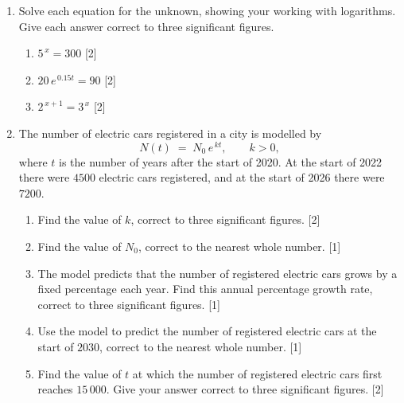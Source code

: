 \documentclass[12pt, twoside]{article}
\begin{document}
\begin{enumerate}[itemsep=0.15cm]
\newpage

\item[2.] [Maximum mark: 6]

Solve each equation for the unknown, showing your working with
logarithms. Give each answer correct to three significant figures.

\begin{enumerate}[itemsep=0.1cm]
  \item $5^{\,x} = 300$ \hfill [2]
  \item $20\, e^{\,0.15 t} = 90$ \hfill [2]
  \item $2^{\,x+1} = 3^{\,x}$ \hfill [2]
\end{enumerate}


\newpage

\item[3.] [Maximum mark: 7]

The number of electric cars registered in a city is modelled by
$$N(t) \;=\; N_{0}\, e^{\,k t}, \qquad k > 0,$$
where $t$ is the number of years after the start of 2020. At the start
of 2022 there were $4500$ electric cars registered, and at the start of
2026 there were $7200$.

\begin{enumerate}[itemsep=0.1cm]
  \item Find the value of $k$, correct to three significant figures.
  \hfill [2]
  \item Find the value of $N_{0}$, correct to the nearest whole number.
  \hfill [1]
  \item The model predicts that the number of registered electric cars
  grows by a fixed percentage each year. Find this annual percentage
  growth rate, correct to three significant figures. \hfill [1]
  \item Use the model to predict the number of registered electric cars
  at the start of $2030$, correct to the nearest whole number.
  \hfill [1]
  \item Find the value of $t$ at which the number of registered
  electric cars first reaches $15\,000$. Give your answer correct to
  three significant figures. \hfill [2]
\end{enumerate}


\end{enumerate}
\end{document}
